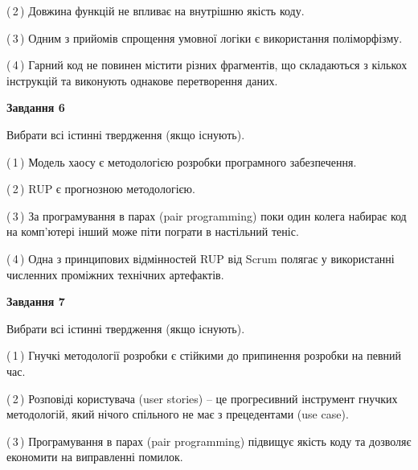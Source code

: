 \documentclass[10pt, ukrainian]{article}
\begin{document}
{\begin {large}
(\,2\,) Довжина функцій не впливає на внутрішню якість коду. %



(\,3\,) Одним з прийомів спрощення умовної логіки є використання поліморфізму. %



(\,4\,) Гарний код не повинен містити різних фрагментів, що складаються з кількох інструкцій та виконують однакове перетворення даних. %

\newpage

{\begin {center}\textbf{Завдання 6}\end {center}}\par
Вибрати всі істинні твердження (якщо існують).\par
\vspace{2mm}



(\,1\,) Модель хаосу є методологією розробки програмного забезпечення. %



(\,2\,) RUP є прогнозною методологією. %



(\,3\,) За програмування в парах (pair programming) поки один колега набирає код на комп'ютері інший може піти пограти в настільний теніс. %



(\,4\,) Одна з принципових відмінностей RUP від Scrum полягає у використанні численних проміжних технічних артефактів. %


{\begin {center}\textbf{Завдання 7}\end {center}}\par
Вибрати всі істинні твердження (якщо існують).\par
\vspace{2mm}



(\,1\,) Гнучкі методології розробки є стійкими до припинення розробки на певний час. %



(\,2\,) Розповіді користувача (user stories) – це прогресивний інструмент гнучких методологій, який нічого спільного не має з прецедентами (use case). %



(\,3\,) Програмування в парах (pair programming) підвищує якість коду та дозволяє економити на виправленні помилок. %




\end{large}}
\end{document}
